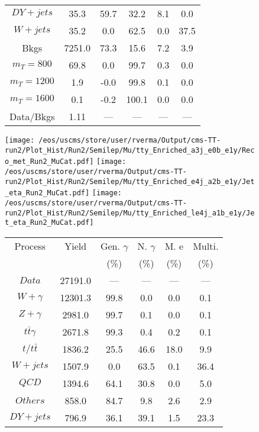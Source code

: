\begin{figure}
\begin{minipage}[c]{0.32\textwidth}
{\begin{tabular}{cccccc}
$ DY+jets $ &  35.3 &  59.7 &  32.2 &  8.1 &  0.0\\
$ W+jets $ &  35.2 &  0.0 &  62.5 &  0.0 &  37.5\\
Bkgs &  7251.0 &  73.3 &  15.6 &  7.2 &  3.9\\
$ m_{T} = 800 $ &  69.8 &  0.0 &  99.7 &  0.3 &  0.0\\
$ m_{T} = 1200 $ &  1.9 &  -0.0 &  99.8 &  0.1 &  0.0\\
$ m_{T} = 1600 $ &  0.1 &  -0.2 &  100.1 &  0.0 &  0.0\\
Data/Bkgs &  1.11 &  --- &  --- &  --- &  ---\\
\hline
\end{tabular}
}
\end{minipage}
\end{figure}

\begin{figure}
\centering
\texttt{[image: /eos/uscms/store/user/rverma/Output/cms-TT-run2/Plot\_Hist/Run2/Semilep/Mu/tty\_Enriched\_a3j\_e0b\_e1y/Reco\_met\_Run2\_MuCat.pdf]}
\texttt{[image: /eos/uscms/store/user/rverma/Output/cms-TT-run2/Plot\_Hist/Run2/Semilep/Mu/tty\_Enriched\_e4j\_a2b\_e1y/Jet\_eta\_Run2\_MuCat.pdf]}
\texttt{[image: /eos/uscms/store/user/rverma/Output/cms-TT-run2/Plot\_Hist/Run2/Semilep/Mu/tty\_Enriched\_le4j\_a1b\_e1y/Jet\_eta\_Run2\_MuCat.pdf]}
\begin{minipage}[c]{0.32\textwidth}
\centering
\tiny{
\begin{tabular}{cccccc}
\hline
Process & Yield & Gen. $\gamma$ & N. $\gamma$ & M. e & Multi. \\
 &  & (\%) & (\%) & (\%) & (\%)  \\
\hline
                                                                      $ Data $ &  27191.0 &  --- &  --- &  --- &  ---\\
$ W+\gamma $ &  12301.3 &  99.8 &  0.0 &  0.0 &  0.1\\
$ Z+\gamma $ &  2981.0 &  99.7 &  0.1 &  0.0 &  0.1\\
$ t\bar{t}\gamma $ &  2671.8 &  99.3 &  0.4 &  0.2 &  0.1\\
$ t/t\bar{t} $ &  1836.2 &  25.5 &  46.6 &  18.0 &  9.9\\
$ W+jets $ &  1507.9 &  0.0 &  63.5 &  0.1 &  36.4\\
$ QCD $ &  1394.6 &  64.1 &  30.8 &  0.0 &  5.0\\
$ Others $ &  858.0 &  84.7 &  9.8 &  2.6 &  2.9\\
$ DY+jets $ &  796.9 &  36.1 &  39.1 &  1.5 &  23.3\\

\end{tabular}}
\end{minipage}
\end{figure}
